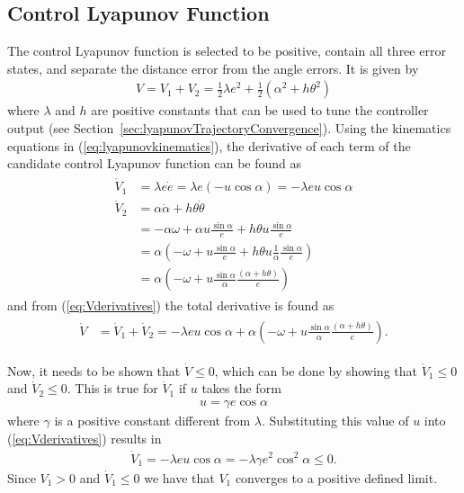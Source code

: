 \subsection{Control Lyapunov Function}%
\label{sec:controllyapunov}
The control Lyapunov function is selected to be positive, contain all three error states, and separate the distance error from the angle errors.
It is given by
\begin{align}
\label{eq:lyapunovfunction}
V = V_1 + V_2 = \frac{1}{2}\lambda e^2 + \frac{1}{2}\left(\alpha^2+h\theta^2\right)
\end{align}
where $\lambda$ and $h$ are positive constants that can be used to tune the controller output (see Section~\ref{sec:lyapunovTrajectoryConvergence}).
Using the kinematics equations in (\ref{eq:lyapunovkinematics}), the derivative of each term of the candidate control Lyapunov function can be found as
\begin{align}
\label{eq:Vderivatives}
\begin{split}
\dot{V}_1 &= \lambda e\dot{e} = \lambda e (-u\cos\alpha) = -\lambda eu\cos\alpha \\
\dot{V}_2 &= \alpha\dot{\alpha}+h\theta\dot{\theta} \\
&= -\alpha\omega + \alpha u\frac{\sin\alpha}{e} + h\theta u\frac{\sin\alpha}{e} \\
&= \alpha\left(-\omega + u\frac{\sin\alpha}{e} + h\theta u\frac{1}{\alpha}\frac{\sin\alpha}{e}\right) \\
&= \alpha\left(-\omega + u\frac{\sin\alpha}{\alpha}\frac{(\alpha+h\theta)}{e}\right)
\end{split}
\end{align}
and from (\ref{eq:Vderivatives}) the total derivative is found as
\begin{align}
\label{eq:lyapunovfunctionderivative}
\begin{split}
\dot{V} &= \dot{V}_1 + \dot{V}_2 = -\lambda e u\cos\alpha + \alpha\left(-\omega+u\frac{\sin\alpha}{\alpha}\frac{(\alpha+h\theta)}{e}\right).
\end{split}
\end{align}

Now, it needs to be shown that $\dot{V}\leq0$, which can be done by showing that $\dot{V}_1\leq0$ and $\dot{V}_2\leq0$.
This is true for $\dot{V}_1$ if $u$ takes the form
\begin{align}
\label{eq:lyapunovu}
u = \gamma e\cos\alpha
\end{align}
where $\gamma$ is a positive constant different from $\lambda$.
Substituting this value of $u$ into (\ref{eq:Vderivatives}) results in
\begin{align}
\label{eq:V1dotfinal}
\dot{V}_1 = -\lambda eu\cos\alpha = -\lambda\gamma e^2\cos^2\alpha \leq 0.
\end{align}
Since $V_1>0$ and $\dot{V}_1\leq0$ we have that $V_1$ converges to a positive defined limit.

